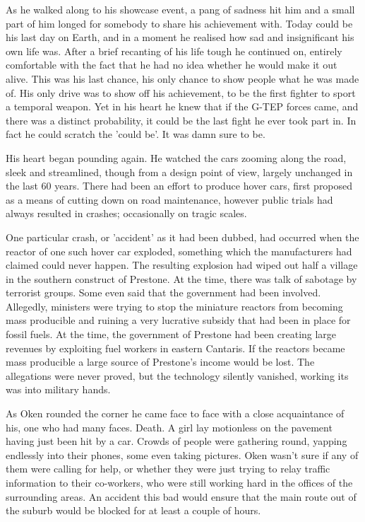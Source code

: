 As he walked along to his showcase event, a pang of sadness hit him and a small part of him longed for somebody to share his achievement with. Today could be his last day on Earth, and in a moment he realised how sad and insignificant his own life was. After a brief recanting of his life tough he continued on, entirely comfortable with the fact that he had no idea whether he would make it out alive. This was his last chance, his only chance to show people what he was made of. His only drive was to show off his achievement, to be the first fighter to sport a temporal weapon. Yet in his heart he knew that if the G-TEP forces came, and there was a distinct probability, it could be the last fight he ever took part in. In fact he could scratch the 'could be'. It was damn sure to be.

His heart began pounding again. He watched the cars zooming along the road, sleek and streamlined, though from a design point of view, largely unchanged in the last 60 years. There had been an effort to produce hover cars, first proposed as a means of cutting down on road maintenance, however public trials had always resulted in crashes; occasionally on tragic scales.

One particular crash, or 'accident' as it had been dubbed, had occurred when the reactor of one such hover car exploded, something which the manufacturers had claimed could never happen. The resulting explosion had wiped out half a village in the southern construct of Prestone. At the time, there was talk of sabotage by terrorist groups. Some even said that the government had been involved. Allegedly, ministers were trying to stop the miniature reactors from becoming mass producible and ruining a very lucrative subsidy that had been in place for fossil fuels. At the time, the government of Prestone had been creating large revenues by exploiting fuel workers in eastern Cantaris. If the reactors became mass producible a large source of Prestone's income would be lost. The allegations were never proved, but the technology silently vanished, working its was into military hands.

As Oken rounded the corner he came face to face with a close acquaintance of his, one who had many faces. Death. A girl lay motionless on the pavement having just been hit by a car. Crowds of people were gathering round, yapping endlessly into their phones, some even taking pictures. Oken wasn't sure if any of them were calling for help, or whether they were just trying to relay traffic information to their co-workers, who were still working hard in the offices of the surrounding areas. An accident this bad would ensure that the main route out of the suburb would be blocked for at least a couple of hours.

